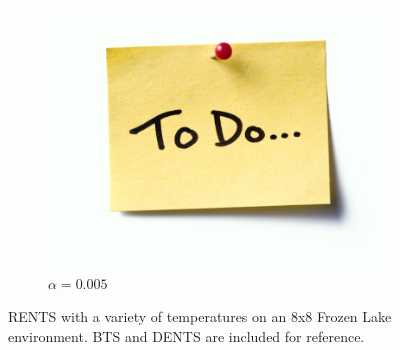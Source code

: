 \begin{figure}
\begin{subfigure}[b]{0.32\textwidth}
                    \centering
                    \includegraphics[width=\textwidth]{figures/todo.jpg}
                    \caption{$\alpha=0.005$}
                \end{subfigure}
                
                \caption{RENTS with a variety of temperatures on an 8x8 Frozen Lake environment. BTS and DENTS are included for reference.}
                \label{fig:fl_param_sens_rents}
            \end{figure}
            
